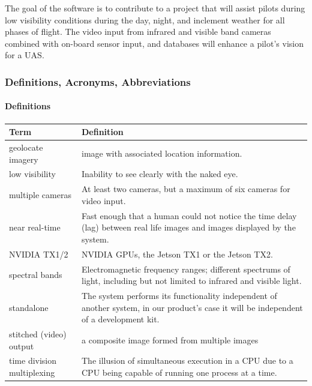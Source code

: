The goal of the software is to contribute to a project that will assist pilots during 
low visibility conditions during the day, night, and inclement weather for all phases 
of flight. The video input from infrared and visible band cameras combined with 
on-board sensor input, and databases will enhance a pilot's vision for a UAS.\\

\subsubsection{Definitions, Acronyms, Abbreviations}

\paragraph{Definitions}

\begin{tabular}{|l|p{11cm}|}
	\hline
	\textbf{Term} & \textbf{Definition}\\
	\hline
	geolocate imagery & image with associated location information.\\
	\hline
	low visibility & Inability to see clearly with the naked eye.\\
	\hline	
	multiple cameras & At least two cameras, but a maximum of six cameras for 
	video input.\\
	\hline
	near real-time & Fast enough that a human could not notice the time 
	delay (lag) between \newline real life images and images displayed by the system.\\
	\hline
	NVIDIA TX1/2 & NVIDIA GPUs, the Jetson TX1 or the Jetson TX2.\\
	\hline
	spectral bands & Electromagnetic frequency ranges; different 
	spectrums of light, including \newline but not limited to infrared 
	and visible light.\\
	\hline
	standalone & The system performs its functionality independent of another
	system, in our product's case it will be independent of a development kit. \\
	\hline
	stitched (video) output & a composite image formed from multiple images\\
	\hline
	time division multiplexing & The illusion of simultaneous execution in a CPU due
	to a CPU being capable of running one process at a time.\\
	\hline
\end{tabular}

